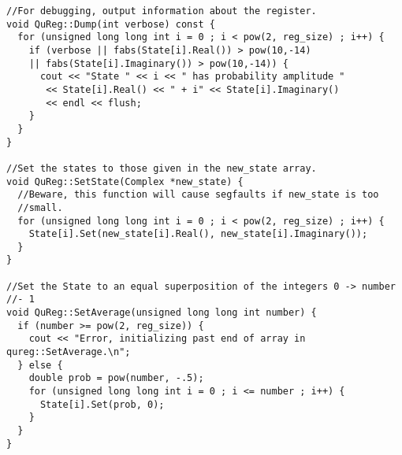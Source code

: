 \documentclass[]{article}
\begin{document}
\begin{verbatim}
//For debugging, output information about the register.
void QuReg::Dump(int verbose) const {
  for (unsigned long long int i = 0 ; i < pow(2, reg_size) ; i++) {
    if (verbose || fabs(State[i].Real()) > pow(10,-14) 
	|| fabs(State[i].Imaginary()) > pow(10,-14)) {
      cout << "State " << i << " has probability amplitude " 
	   << State[i].Real() << " + i" << State[i].Imaginary() 
	   << endl << flush;
    }
  }
}

//Set the states to those given in the new_state array.
void QuReg::SetState(Complex *new_state) {
  //Beware, this function will cause segfaults if new_state is too
  //small.
  for (unsigned long long int i = 0 ; i < pow(2, reg_size) ; i++) {
    State[i].Set(new_state[i].Real(), new_state[i].Imaginary());
  }
}

//Set the State to an equal superposition of the integers 0 -> number
//- 1
void QuReg::SetAverage(unsigned long long int number) {
  if (number >= pow(2, reg_size)) {
    cout << "Error, initializing past end of array in qureg::SetAverage.\n";
  } else {
    double prob = pow(number, -.5);
    for (unsigned long long int i = 0 ; i <= number ; i++) {
      State[i].Set(prob, 0);
    }
  }
}
\end{verbatim}
\end{document}
